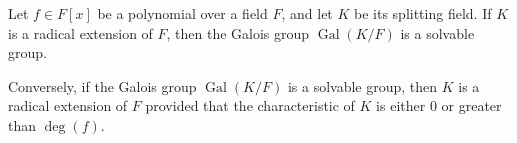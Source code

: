 \documentclass{article}
\begin{document}
Let $f \in F[x]$ be a polynomial over a field $F$, and let $K$ be its splitting field. If $K$ is a radical extension of $F$, then the Galois group $\operatorname{Gal}(K/F)$ is a solvable group.

Conversely, if the Galois group $\operatorname{Gal}(K/F)$ is a solvable group, then $K$ is a radical extension of $F$ provided that the characteristic of $K$ is either $0$ or greater than $\deg(f)$.
\end{document}
